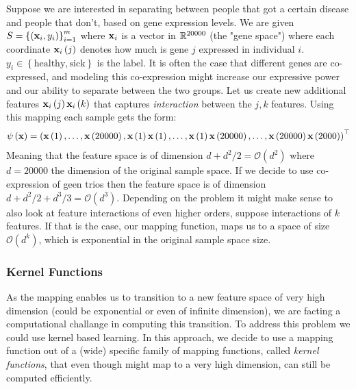 \begin{example}
	Suppose we are interested in separating between people that got a certain disease and people that don't, based on gene expression levels. We are given $S=\left\{\left(\mathbf{x}_i,y_i\right)\right\}^m_{i=1}$ where $\mathbf{x}_i$ is a vector in $\mathbb{R}^{20000}$ (the "gene space") where each coordinate $\mathbf{x}_i\left(j\right)$ denotes how much is gene $j$ expressed in individual $i$. $y_i\in\left\{\text{healthy},\text{sick}\right\}$ is the label. It is often the case that different genes are co-expressed, and modeling this co-expression might increase our expressive power and our ability to separate between the two groups. Let us create new additional features $\mathbf{x}_i\left(j\right)\mathbf{x}_i\left(k\right)$ that captures \textit{interaction} between the $j,k$ features. Using this mapping each sample gets the form: $$ \psi\left(\mathbf{x}\right) = \left(\mathbf{x}\left(1\right),\ldots,\mathbf{x}\left(20000\right),\mathbf{x}\left(1\right)\mathbf{x}\left(1\right),\ldots,\mathbf{x}\left(1\right)\mathbf{x}\left(20000\right),\ldots,\mathbf{x}\left(20000\right)\mathbf{x}\left(2000\right)\right)^\top $$ 
	Meaning that the feature space is of dimension $d+d^2/2=\mathcal{O}\left(d^2\right)$ where $d=20000$ the dimension of the original sample space. If we decide to use co-expression of geen trios then the feature space is of dimension $d+d^2/2 + d^3/3=\mathcal{O}\left(d^3\right)$. Depending on the problem it might make sense to also look at feature interactions of even higher orders, suppose interactions of $k$ features. If that is the case, our mapping function, maps us to a space of size $\mathcal{O}\left(d^k\right)$, which is exponential in the original sample space size.
\end{example}

\subsubsection{Kernel Functions}
As the mapping enables us to transition to a new feature space of very high dimension (could be exponential or even of infinite dimension), we are facting a computational challange in computing this transition. To address this problem we could use kernel based learning. In this approach, we decide to use a mapping function out of a (wide) specific family of mapping functions, called \textit{kernel functions}, that even though might map to a very high dimension, can still be computed efficiently.\\

